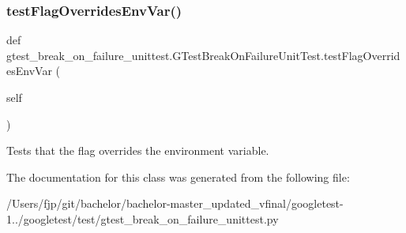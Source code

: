 \subsubsection{\texorpdfstring{test\+Flag\+Overrides\+Env\+Var()}{testFlagOverridesEnvVar()}}
{\footnotesize\ttfamily def gtest\+\_\+break\+\_\+on\+\_\+failure\+\_\+unittest.\+G\+Test\+Break\+On\+Failure\+Unit\+Test.\+test\+Flag\+Overrides\+Env\+Var (\begin{DoxyParamCaption}\item[{}]{self }\end{DoxyParamCaption})}

\begin{DoxyVerb}Tests that the flag overrides the environment variable.\end{DoxyVerb}
 

The documentation for this class was generated from the following file\+:\begin{DoxyCompactItemize}
\item 
/\+Users/fjp/git/bachelor/bachelor-\/master\+\_\+updated\+\_\+vfinal/googletest-\/1../googletest/test/gtest\+\_\+break\+\_\+on\+\_\+failure\+\_\+unittest.\+py\end{DoxyCompactItemize}
